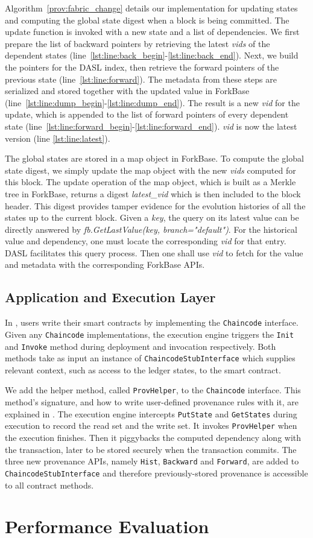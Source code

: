 Algorithm~\ref{prov:fabric_change} details our implementation for updating states
and computing the global state digest when a block is being
committed. The update function is invoked with a new state
and a list of dependencies. We first prepare the list of backward pointers by retrieving the latest {\em vids} of the dependent
states (line~\ref{lst:line:back_begin}-\ref{lst:line:back_end}). Next, we build the pointers for the DASL
index, then retrieve the forward pointers
of the previous state (line~\ref{lst:line:forward}). The metadata from these steps are serialized and stored together with the updated
value in ForkBase (line~\ref{lst:line:dump_begin}-\ref{lst:line:dump_end}). The result is a new {\em vid} for
the update, which is appended to the list of forward pointers of every dependent state
(line~\ref{lst:line:forward_begin}-\ref{lst:line:forward_end}). {\em vid} is now 
the latest version (line \ref{lst:line:latest}). 

The global states are stored in a map object in ForkBase. To compute the global state digest, we simply update
the map object with the new {\em vids} computed for this block. The update operation of the map object, which
is built as a Merkle tree in ForkBase, returns a digest {\em latest\_vid} which is then included
to the block header.  This digest provides tamper evidence for the evolution histories of all the states up to
the current block.
Given a {\em key}, the query on its latest value can be directly answered by \textit{fb.GetLastValue(key, branch="default")}. For the historical value and dependency, one must locate the corresponding {\em vid} for that entry. 
DASL facilitates this query process. 
Then one shall use {\em vid} to fetch for the value and metadata with the corresponding ForkBase APIs. 

\subsection{Application and Execution Layer}
In {\fs}, users write their smart contracts by implementing the \texttt{Chaincode} interface. Given any  \texttt{Chaincode} implementations, the execution engine triggers the \texttt{Init} and \texttt{Invoke} method during deployment and
invocation respectively. Both methods take as input an instance of \texttt{ChaincodeStubInterface} which
supplies relevant context, such as access to the ledger states, to the smart contract. 

We add the helper method, called \texttt{ProvHelper}, to the \texttt{Chaincode} interface. This method's signature,
and how to write user-defined provenance rules with it, are explained in . The
execution engine intercepts \texttt{PutState} and \texttt{GetStates} during execution to record the read set and the
write set. It invokes \texttt{ProvHelper} when the execution finishes. Then it piggybacks the computed dependency along with the transaction, later to be stored securely when the transaction commits. 
The three new provenance APIs, namely \texttt{Hist}, \texttt{Backward} and \texttt{Forward}, are added to \texttt{ChaincodeStubInterface}
and therefore previously-stored provenance is accessible to all contract methods. 


\section{Performance Evaluation}
\label{prov:sec:exps}
